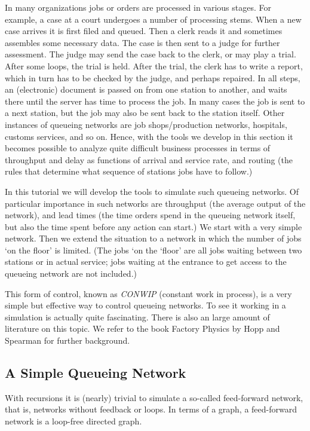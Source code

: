 \documentclass{scrartcl}
\begin{document}
In many organizations jobs or orders are  processed in various stages. For example,  a case at a court undergoes a number of processing stems. When a new case arrives it is first filed and queued. Then a clerk reads it and sometimes assembles some necessary data. The case is then sent to a judge for further assessment. The judge may send the case back to the clerk, or may play a trial. After some loops, the trial is held. After the trial, the clerk has to write a report, which in turn has to be checked by the judge, and perhaps repaired. In all steps, an (electronic) document is passed on from one station to another, and waits there until the server has time to process the job. In many cases the job is sent to a next station, but the job may also be sent back to the station itself. Other instances of queueing networks are job shops/production networks, hospitals, customs services, and so on. Hence, with the tools we develop in this section it becomes possible to analyze quite difficult business processes in terms of throughput and delay as functions of arrival and service rate, and routing (the rules that determine what sequence of stations jobs have to follow.)

In this tutorial we will develop the tools to simulate such queueing networks. Of particular importance in such networks are throughput (the average output of the network), and lead times (the time orders spend in the queueing network itself, but also the time spent before any action can start.) We start with a very simple network. Then we extend the situation to a network in which the number of jobs `on the floor' is limited. (The jobs `on the `floor' are all jobs waiting between two stations or in actual service; jobs waiting at the entrance to get access to the queueing network are not included.) 

This form of control, known as \emph{CONWIP} (constant work in process), is a very simple but effective way to control queueing networks. To see it working in a simulation is actually quite fascinating. There is also an large amount of literature on this topic. We refer to the book Factory Physics by Hopp and Spearman for further background. 


\subsection{A Simple Queueing Network}


With recursions it is (nearly) trivial to simulate a so-called feed-forward network, that is, networks without feedback or loops.  In terms of a graph, a feed-forward network is a loop-free directed graph. 
\end{document}
